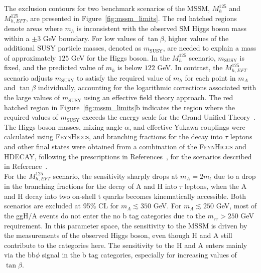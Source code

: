 The exclusion contours for two benchmark scenarios of the \ac{MSSM}, $M_{h}^{125}$ and $M_{h,EFT}^{125}$, are presented in Figure~\ref{fig:mssm_limits}.
The red hatched regions denote areas where $m_{h}$ is inconsistent with the observed \ac{SM} Higgs boson mass within a ${\pm}3$ GeV boundary. 
For low values of $\tan\beta$, higher values of the additional SUSY particle masses, denoted as $m_{\text{SUSY}}$, are needed to explain a mass of approximately $125$ GeV for the Higgs boson. 
In the $M_{h}^{125}$ scenario, $m_{\text{SUSY}}$ is fixed, and the predicted value of $m_{h}$ is below $122$ GeV. 
In contrast, the $M_{h,EFT}^{125}$ scenario adjusts $m_{\text{SUSY}}$ to satisfy the required value of $m_{h}$ for each point in $m_{A}$ and $\tan\beta$ individually, accounting for the logarithmic corrections associated with the large values of $m_{\text{SUSY}}$ using an effective field theory approach. 
The red hatched region in Figure~\ref{fig:mssm_limits}b indicates the region where the required values of $m_{\text{SUSY}}$ exceeds the energy scale for the Grand Unified Theory~\cite{Bahl:2019ago}. 
The Higgs boson masses, mixing angle $\alpha$, and effective Yukawa couplings were calculated using \textsc{FeynHiggs}, and branching fractions for the decay into $\tau$ leptons and other final states were obtained from a combination of the \textsc{FeynHiggs} and \textsc{HDECAY}, following the prescriptions in References~\cite{LHCHiggsCrossSectionWorkingGroup:2013rie,deFlorian:2016spz,Denner:2011mq}, for the scenarios described in Reference~\cite{Bagnaschi:2791954}. \\

For the $M_{h,EFT}^{125}$ scenario, the sensitivity sharply drops at $m_{A}=2m_{t}$ due to a drop in the branching fractions for the decay of A and H into $\tau$ leptons, when the A and H decay into two on-shell t quarks becomes kinematically accessible. 
Both scenarios are excluded at 95\% CL for $m_{A}\lesssim350$ GeV. 
For $m_{A}\lesssim250$ GeV, most of the ggH/A events do not enter the no b tag categories due to the $m_{\tau\tau}>250$ GeV requirement. 
In this parameter space, the sensitivity to the \ac{MSSM} is driven by the measurements of the observed Higgs boson, even though H and A still contribute to the categories here. 
The sensitivity to the H and A enters mainly via the bb$\phi$ signal in the b tag categories, especially for increasing values of $\tan\beta$. \\

